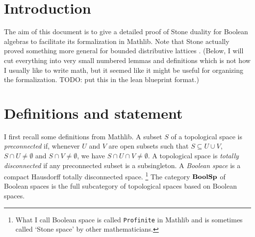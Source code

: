 %


\newcommand{\docref}[3]{}

\chapter{Introduction}

The aim of this document is to give a detailed proof of Stone duality for Boolean
algebras \cite{Sto1937BA} to facilitate its formalization in Mathlib. Note that
Stone actually proved something more general for bounded distributive lattices
\cite{Sto1937}. (Below, I will cut everything into very small numbered lemmas
and definitions which is not how I usually like to write math, but it seemed
like it might be useful for organizing the formalization. TODO: put this in the
lean blueprint format.)

\chapter{Definitions and statement}
I first recall some definitions from Mathlib. A subset $S$ of a topological
space is \emph{preconnected} if, whenever $U$ and $V$ are open subsets such
that $S \subseteq U \cup V$, $S \cap U \neq \emptyset$ and $S \cap V \neq
\emptyset$, we have $S \cap U \cap V \neq \emptyset$. A topological space is
\emph{totally disconnected} if any preconnected subset is a subsingleton. 
A \emph{Boolean space} is a compact Hausdorff totally disconnected space.%
\footnote{What I call Boolean space is called \texttt{Profinite} in Mathlib and
is sometimes called `Stone space' by other mathematicians.} The category
$\mathbf{BoolSp}$ of Boolean spaces is the full subcategory of topological spaces based
on Boolean spaces.

